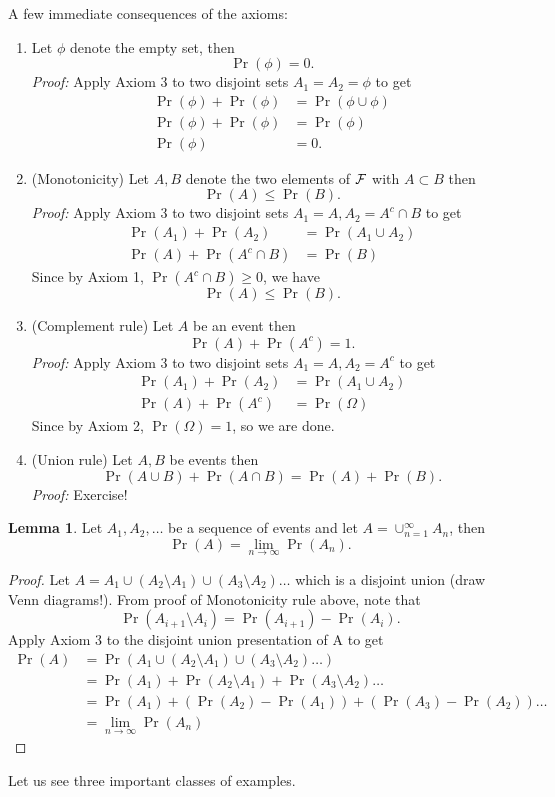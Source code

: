 \documentclass[letterpaper, 12pt]{article}
\newcommand{\1}{\mathds{1}} %
\theoremstyle{definition}
\newtheorem*{lemma*}{Lemma}
\begin{document}
A few immediate consequences of the axioms:

\begin{enumerate}
\item Let $\phi$ denote the empty set, then $$\Pr(\phi) = 0.$$ 
\textit{Proof:} Apply Axiom 3 to two disjoint sets $A_1=A_2 =\phi$ to get
\begin{align*}
 \Pr(\phi) + \Pr(\phi) &= \Pr(\phi \cup \phi)\\
 \Pr(\phi) + \Pr(\phi) &= \Pr(\phi)\\
\Pr(\phi) &= 0.
\end{align*}
\item (Monotonicity) Let $A,B$ denote the two elements of $\cal F$ with $A \subset B$ then $$\Pr(A) \leq  \Pr(B).$$ 
\textit{Proof:} Apply Axiom 3 to two disjoint sets $A_1= A, A_2=A^c \cap B$ to get
\begin{align*}
 \Pr(A_1) + \Pr(A_2) &= \Pr(A_1 \cup A_2)\\
 \Pr(A) + \Pr(A^c \cap B) &= \Pr(B)
\end{align*}
Since by Axiom 1, $\Pr(A^c \cap B) \geq 0$, we have $$\Pr(A) \leq  \Pr(B).$$ 
\item (Complement rule) Let $A$ be an event then $$\Pr(A) + \Pr(A^c) =1.$$ 
\textit{Proof:} Apply Axiom 3 to two disjoint sets $A_1= A, A_2=A^c$ to get
\begin{align*}
 \Pr(A_1) + \Pr(A_2) &= \Pr(A_1 \cup A_2)\\
 \Pr(A) + \Pr(A^c) &= \Pr(\Omega)
\end{align*}
Since by Axiom 2, $\Pr(\Omega) =1$, so we are done. 

\item (Union rule) Let $A,B$ be events then $$\Pr(A \cup B) +  \Pr(A \cap B) = \Pr(A) + \Pr(B).$$ 
\textit{Proof:} Exercise!  
\end{enumerate}

\begin{lemma*}
\label{lem:sigma-monotonic}
Let $A_1 , A_2 , \ldots$ be a sequence of events and let $A = \cup_{n=1}^{\infty} A_n$, then \[\Pr(A) = \lim_{n \to \infty} \Pr(A_n).\]
\end{lemma*}
\begin{proof}
Let $A = A_1 \cup (A_2\setminus A_1) \cup (A_3 \setminus A_2) \ldots$ which is a disjoint union (draw Venn diagrams!). From proof of Monotonicity rule above, note that $$\Pr(A_{i+1} \setminus A_i)  = \Pr(A_{i+1}) - \Pr(A_i).$$ Apply Axiom 3 to the disjoint union presentation of A to get
\begin{align*}
\Pr(A) &=  \Pr(A_1 \cup (A_2\setminus A_1) \cup (A_3 \setminus A_2) \ldots)\\
       &=  \Pr(A_1) + \Pr(A_2\setminus A_1) + \Pr(A_3 \setminus A_2) \ldots\\
       &=  \Pr(A_1) + (\Pr(A_2) - \Pr(A_1)) + (\Pr(A_3) - \Pr(A_2)) \ldots\\
       &=  \lim_{n \to \infty} \Pr(A_n)
\end{align*}
\end{proof}
Let us see three important classes of examples.
\end{document}
